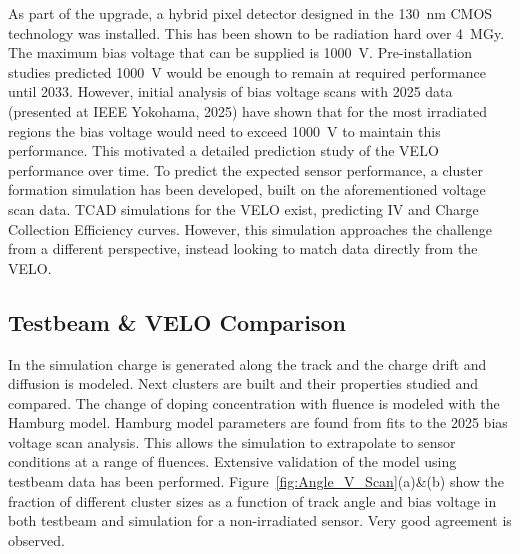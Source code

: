 \documentclass[10pt,twocolumn]{article}
\begin{document}
As part of the upgrade, a hybrid pixel detector designed in the \qty{130}{nm} CMOS technology was installed.
This has been shown to be radiation hard over \qty{4}{MGy}\cite{Aaij_2024}. The maximum bias voltage that can be supplied is 
\qty{1000}{V}. 
Pre-installation studies predicted \qty{1000}{V} would be enough to remain at required performance until 2033\cite{Bediaga:2013tje}. However, initial analysis of bias voltage scans with 2025  data (presented at IEEE Yokohama, 2025) have shown that for the most irradiated regions the bias voltage would need to exceed \qty{1000}{V} to maintain this performance. This 
motivated a detailed prediction study of the VELO performance over time.
To predict the expected sensor performance, a cluster formation simulation has been developed, built on the aforementioned 
voltage scan data. TCAD simulations for the VELO exist\cite{FOLKESTAD201794}, predicting IV and Charge Collection Efficiency curves.
However, this simulation approaches the challenge from a different perspective, instead looking to match data directly from the VELO. 

\subsection*{Testbeam \& VELO Comparison}

In the simulation charge is generated along the track and the charge drift and diffusion is modeled. Next clusters are built and their properties studied and compared. The change of doping concentration with fluence is modeled with the Hamburg model\cite{Moll:1999kv, Grummer}. Hamburg model parameters are found from fits to the 2025 bias voltage scan analysis. This allows the simulation to extrapolate to sensor conditions at a range of fluences.
Extensive validation of the model using testbeam data\cite{Buchanan:2653356} has been performed. Figure~\ref{fig:Angle_V_Scan}(a)\&(b) show the fraction of different cluster sizes as a function of track angle and bias voltage in both testbeam and simulation for a non-irradiated sensor.
Very good agreement is observed.
\end{document}
